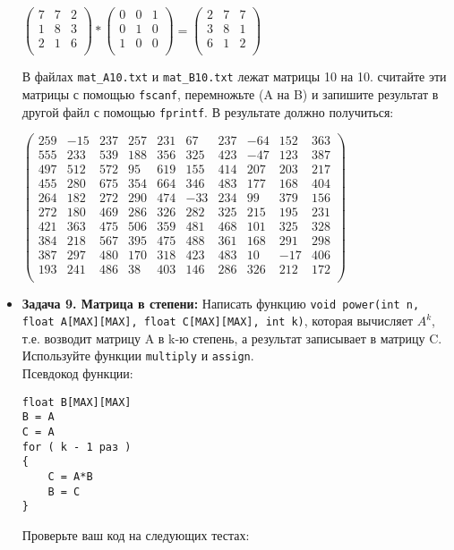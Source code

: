 \documentclass{article}
\begin{document}
\begin{itemize}
\begin{center}

$
\begin{pmatrix}
7 & 7 & 2 \\
1 & 8 & 3 \\
2 & 1 & 6 \\
\end{pmatrix} *
\begin{pmatrix}
0 & 0 & 1 \\
0 & 1 & 0 \\
1 & 0 & 0 \\
\end{pmatrix}
=
\begin{pmatrix}
2 & 7 & 7 \\
3 & 8 & 1 \\
6 & 1 & 2 \\
\end{pmatrix}
$
\end{center}
В файлах \texttt{mat\_A10.txt} и \texttt{mat\_B10.txt} лежат матрицы 10 на 10. считайте эти матрицы с помощью \texttt{fscanf}, перемножьте (A на B) и запишите результат в другой файл с помощью \texttt{fprintf}. В результате должно получиться:
\begin{center}
$
\begin{pmatrix}
259 & -15 & 237 & 257 &  231 &  67  & 237  & -64  & 152  & 363 \\
555 & 233 & 539 & 188 &  356 &  325 &  423 &  -47 &  123 &  387 \\
497 & 512 & 572 & 95  & 619  & 155  & 414  & 207  & 203  & 217 \\
455 & 280 & 675 & 354 &  664 &  346 &  483 &  177 &  168 &  404 \\
264 & 182 & 272 & 290 &  474 &  -33 &  234 &  99  & 379  & 156 \\
272 & 180 & 469 & 286 &  326 &  282 &  325 &  215 &  195 &  231 \\
421 & 363 & 475 & 506 &  359 &  481 &  468 &  101 &  325 &  328 \\
384 & 218 & 567 & 395 &  475 &  488 &  361 &  168 &  291 &  298 \\
387 & 297 & 480 & 170 &  318 &  423 &  483 &  10  & -17  & 406 \\
193 & 241 & 486 & 38  & 403  & 146  & 286  & 326  & 212  & 172 \\
\end{pmatrix}
$
\end{center}

\item \textbf{Задача 9. Матрица в степени:} Написать функцию \texttt{void power(int n, float A[MAX][MAX], float C[MAX][MAX], int k)}, которая вычисляет $A^k$, т.е. возводит матрицу A в k-ю степень, а результат записывает в матрицу C. Используйте функции \texttt{multiply} и \texttt{assign}. \\ Псевдокод функции:
\begin{lstlisting}
float B[MAX][MAX]
B = A
C = A
for ( k - 1 раз )
{
	C = A*B
	B = C
}
\end{lstlisting}
Проверьте ваш код на следующих тестах:
\begin{center}


\end{center}
\end{itemize}
\end{document}
